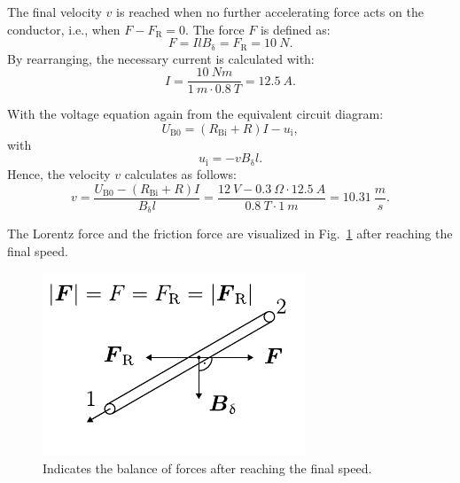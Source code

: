 \begin{solutionblock}
    The final velocity $v$ is reached when no further accelerating force acts on the conductor, i.e., when $F - F_{\mathrm{R}} = 0$. The force $F$ is defined as:
    \begin{equation}
        F = I l B_{\updelta}
        = F_{\mathrm{R}} = 10 \ \si{N}.
    \end{equation}
    By rearranging, the necessary current is calculated with:
    \begin{equation}
        I = \frac{10 \ \si{Nm}}{1 \ \si{m} \cdot 0.8 \ \si{T}}
        = 12.5 \ \si{A}.
    \end{equation}

    With the voltage equation again from the equivalent circuit diagram:
    \begin{equation}
        U_{\mathrm{B0}} = (R_{\mathrm{Bi}}+R)I - u_{\mathrm{i}},
    \end{equation}
    with
    \begin{equation}
        u_{\mathrm{i}} = - v B_{\updelta} l.
    \end{equation}
    Hence, the velocity $v$ calculates as follows:
    \begin{equation}
        v = \frac{U_{\mathrm{B0}}-(R_{\mathrm{Bi}}+R)I}{B_{\updelta} l}
        = \frac{12 \ \si{V} - 0.3 \ \si{\Omega} \cdot 12.5 \ \si{A}}{0.8 \ \si{T} \cdot 1 \ \si{m}}
        = 10.31 \ \frac{\si{m}}{\si{s}}.
    \end{equation}

    The Lorentz force and the friction force are visualized in Fig.~\ref{fig:solution_LorentzForce_balanceOfForces} after reaching the final speed.
    \begin{figure}[ht]
        \centering
        \includegraphics{fig/ex01/solution_LorentzForce_balanceOfForces.pdf}
        \caption{Indicates the balance of forces after reaching the final speed.}
        \label{fig:solution_LorentzForce_balanceOfForces}
    \end{figure}

\end{solutionblock}



